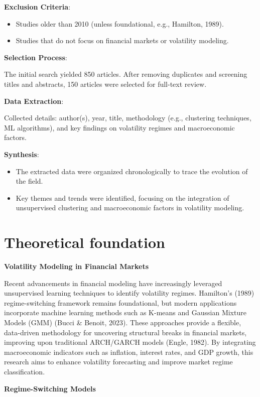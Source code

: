 \item \textbf{Exclusion Criteria}:
\begin{itemize} 
\item Studies older than 2010 (unless foundational, e.g., Hamilton, 1989).
\item Studies that do not focus on financial markets or volatility modeling.
\end{itemize}

\textbf{Selection Process}:

The initial search yielded 850 articles. After removing duplicates and screening titles and abstracts, 150 articles were selected for full-text review.

\textbf{Data Extraction}:

Collected details: author(s), year, title, methodology (e.g., clustering techniques, ML algorithms), and key findings on volatility regimes and macroeconomic factors.

\textbf{Synthesis}:
\begin{itemize}
\item The extracted data were organized chronologically to trace the evolution of the field.
\item Key themes and trends were identified, focusing on the integration of unsupervised clustering and macroeconomic factors in volatility modeling.
\end{itemize}

\section{Theoretical foundation}

\textbf{Volatility Modeling in Financial Markets}

Recent advancements in financial modeling have increasingly leveraged unsupervised learning techniques to identify volatility regimes. Hamilton’s (1989) regime-switching framework \cite{hamilton_markov_1989} remains foundational, but modern applications incorporate machine learning methods such as K-means and Gaussian Mixture Models (GMM) (Bucci \& Benoit, 2023). These approaches provide a flexible, data-driven methodology for uncovering structural breaks in financial markets, improving upon traditional ARCH/GARCH models (Engle, 1982). By integrating macroeconomic indicators such as inflation, interest rates, and GDP growth, this research aims to enhance volatility forecasting and improve market regime classification.

\textbf{Regime-Switching Models}

